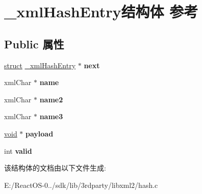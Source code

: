 \hypertarget{struct__xml_hash_entry}{}\section{\+\_\+xml\+Hash\+Entry结构体 参考}
\label{struct__xml_hash_entry}
\subsection*{Public 属性}
\begin{DoxyCompactItemize}
\item 
\mbox{\label{struct__xml_hash_entry_a8c09dc3f067cf91f1bb29209e0c12465}} 
\hyperlink{interfacestruct}{struct} \hyperlink{struct__xml_hash_entry}{\+\_\+xml\+Hash\+Entry} $\ast$ {\bfseries next}
\item 
\mbox{\label{struct__xml_hash_entry_a30ee5fb9f0de9fb853b114d0ca72e4ee}} 
xml\+Char $\ast$ {\bfseries name}
\item 
\mbox{\label{struct__xml_hash_entry_a00273e872b063b4d020a3d8393ab5c13}} 
xml\+Char $\ast$ {\bfseries name2}
\item 
\mbox{\label{struct__xml_hash_entry_af3500ed724e2a4bc0e4f858cee868539}} 
xml\+Char $\ast$ {\bfseries name3}
\item 
\mbox{\label{struct__xml_hash_entry_ad71f2701fe02452e1f52606ff8b83b8b}} 
\hyperlink{interfacevoid}{void} $\ast$ {\bfseries payload}
\item 
\mbox{\label{struct__xml_hash_entry_a9a1667fa1458f4b788b0ac96bad8f82f}} 
int {\bfseries valid}
\end{DoxyCompactItemize}


该结构体的文档由以下文件生成\+:\begin{DoxyCompactItemize}
\item 
E\+:/\+React\+O\+S-\/0../sdk/lib/3rdparty/libxml2/hash.\+c\end{DoxyCompactItemize}
